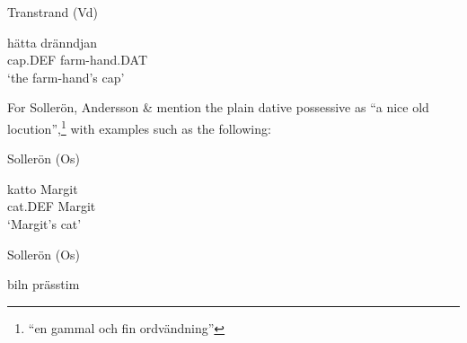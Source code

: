 \z

\item 

Transtrand (Vd)



 \ea\label{}
\gll hätta  dränndjan\\


cap.DEF  farm-hand.DAT\\

\glt ‘the farm-hand’s cap’

\z

For Sollerön, Andersson \& \citet[357]{Danielsson1999} mention the plain dative possessive as “a nice old locution”,\footnote{ “en gammal och fin ordvändning”} with examples such as the following:


\item 

Sollerön (Os)



 \ea\label{}
\gll katto  Margit\\


cat.DEF  Margit\\

\glt ‘Margit’s cat’

\z

\item 

Sollerön (Os)



 \ea\label{}
\gll biln  prässtim\\


